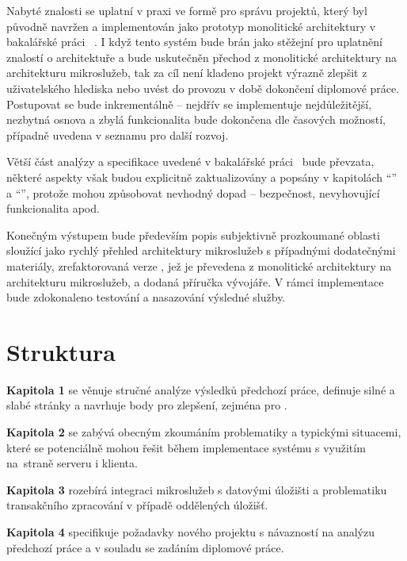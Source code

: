 Nabyté znalosti se uplatní v praxi ve formě  pro správu projektů, který byl původně navržen a implementován jako prototyp monolitické architektury v bakalářské práci ~\cite{bachelorthesis}.
I když tento systém bude brán jako stěžejní pro uplatnění znalostí o architektuře a bude uskutečněn přechod z monolitické architektury na architekturu mikroslužeb, tak za cíl není kladeno projekt výrazně zlepšit z uživatelského hlediska nebo uvést do provozu v době dokončení diplomové práce.
Postupovat se bude inkrementálně – nejdřív se implementuje nejdůležitější, nezbytná osnova a zbylá funkcionalita bude dokončena dle časových možností, případně uvedena v seznamu pro další rozvoj.

Větší část analýzy a specifikace uvedené v bakalářské práci~\cite{bachelorthesis} bude převzata, některé aspekty však budou explicitně zaktualizovány a popsány v kapitolách \enquote{} a \enquote{}, protože mohou způsobovat nevhodný dopad – bezpečnost, nevyhovující funkcionalita apod.

Konečným výstupem bude především popis subjektivně prozkoumané oblasti  sloužící jako rychlý přehled architektury mikroslužeb s případnými dodatečnými materiály, zrefaktorovaná verze , jež je převedena z monolitické architektury na architekturu mikroslužeb, a dodaná příručka vývojáře.
V rámci implementace bude zdokonaleno testování a nasazování výsledné služby.


\newpage



\section{Struktura}\label{sec:struktura}

\textbf{Kapitola 1} se věnuje stručné analýze výsledků předchozí práce, definuje silné a slabé stránky a navrhuje body pro zlepšení, zejména pro .

\textbf{Kapitola 2} se zabývá obecným zkoumáním problematiky  a typickými situacemi, které se potenciálně mohou řešit během implementace systému s využitím \\na~straně serveru i klienta.

\textbf{Kapitola 3} rozebírá integraci mikroslužeb s datovými úložišti a problematiku transakčního zpracování v případě oddělených úložišť.

\textbf{Kapitola 4} specifikuje požadavky nového projektu s návazností na analýzu předchozí práce a v souladu se zadáním diplomové práce.

